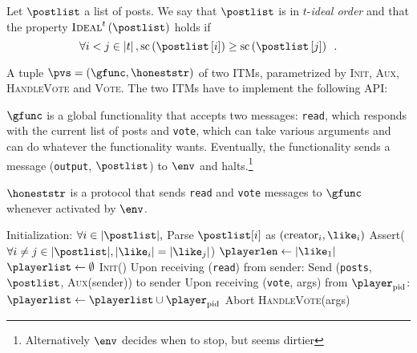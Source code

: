     \begin{definition}
      Let $\postlist$ a list of posts. We say that $\postlist$ is in
      $t$-\emph{ideal order} and that the property
      $\textsc{Ideal}^{t}\left(\postlist\right)$ holds if
      \begin{equation*}
        \forall i < j \in \left|t\right|,
        \mathrm{sc}\left(\postlist\left[i\right]\right) \geq
        \mathrm{sc}\left(\postlist\left[j\right]\right) \enspace.
      \end{equation*}
    \end{definition}

    \begin{definition}
      A tuple $\pvs = \left(\gfunc, \honeststr\right)$ of two ITMs, parametrized
      by \textsc{Init}, \textsc{Aux}, \textsc{HandleVote} and \textsc{Vote}. The
      two ITMs have to implement the following API:

      $\gfunc$ is a global functionality that accepts two messages:
      \texttt{read}, which responds with the current list of posts and
      \texttt{vote}, which can take various arguments and can do whatever the
      functionality wants. Eventually, the functionality sends a message
      (\texttt{output}, $\postlist$) to $\env$ and halts.\footnote{Alternatively
      $\env$ decides when to stop, but seems dirtier}

      $\honeststr$ is a protocol that sends \texttt{read} and \texttt{vote}
      messages to $\gfunc$ whenever activated by $\env$.
    \end{definition}

    \begin{algorithm}[H]
      \caption{$\gfunc\left(\textsc{Init}, \textsc{Aux},
      \textsc{HandleVote}\right)\left(\postlist\right)$}
      \label{alg:gfunc}
      \begin{algorithmic}[1]
        \State Initialization:
        \Indent
          \State $\forall i \in |\postlist|,$ Parse $\postlist[i]$ as
          $\left(\mathrm{creator}_i, \like_i\right)$
          \State Assert($\forall i \neq j \in |\postlist|, |\like_i| =
          |\like_j|$)
          \State $\playerlen \gets |\like_1|$
          \State $\playerlist \gets \emptyset$
          \State \textsc{Init}()
        \EndIndent
        \State
        \State Upon receiving (\texttt{read}) from sender:
        \Indent
          \State Send (\texttt{posts}, $\postlist$, \textsc{Aux}(sender)) to sender
        \EndIndent
        \State
        \State Upon receiving (\texttt{vote}, args) from $\player_{\mathrm{pid}}$:
         \Indent
           \State $\playerlist \gets \playerlist \cup \player_{\mathrm{pid}}$
           \If{$|\playerlist| > \playerlen$}
             \State Abort
           \EndIf
           \State \textsc{HandleVote}(args)
         \EndIndent
      \end{algorithmic}
    \end{algorithm}

